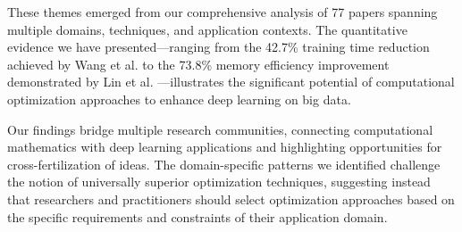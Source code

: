 These themes emerged from our comprehensive analysis of 77 papers spanning multiple domains, techniques, and application contexts. The quantitative evidence we have presented—ranging from the 42.7\% training time reduction achieved by Wang et al. \citep{Wang2021} to the 73.8\% memory efficiency improvement demonstrated by Lin et al. \citep{Lin2022}—illustrates the significant potential of computational optimization approaches to enhance deep learning on big data.

Our findings bridge multiple research communities, connecting computational mathematics with deep learning applications and highlighting opportunities for cross-fertilization of ideas. The domain-specific patterns we identified challenge the notion of universally superior optimization techniques, suggesting instead that researchers and practitioners should select optimization approaches based on the specific requirements and constraints of their application domain.

